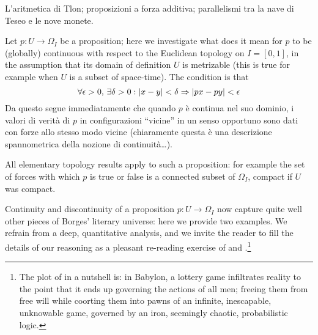 \begin{remark}\label{di_navi_e_numeri}
	L'aritmetica di Tlon; proposizioni a forza additiva; parallelismi tra la nave di Teseo e le nove monete.
\end{remark}
\begin{remark}\label{continuiti}
	Let $p : U \to \Omega_I$ be a proposition; here we investigate what does it mean for $p$ to be (globally) continuous with respect to the Euclidean topology on $I=[0,1]$, in the assumption that its domain of definition $U$ is metrizable (this is true for example when $U$ is a subset of space-time). The condition is that
	\[ \forall \epsilon > 0,\,\exists \delta > 0 : |x-y|< \delta \Rightarrow |px-py| < \epsilon \]
	Da questo segue immediatamente che quando $p$ è continua nel suo dominio, i valori di verità di $p$ in configurazioni ``vicine'' in un senso opportuno sono dati con forze allo stesso modo vicine (chiaramente questa è una descrizione spannometrica della nozione di continuità\dots).

	All elementary topology results apply to such a proposition: for example the set of forces with which $p$ is true or false is a connected subset of $\Omega_I$, compact if $U$ was compact.
\end{remark}
Continuity and discontinuity of a proposition $p : U \to \Omega_I$ now capture quite well other pieces of Borges' literary universe: here we provide two examples. We refrain from a deep, quantitative analysis, and we invite the reader to fill the details of our reasoning as a pleasant re-reading exercise of \cite{babil} and \cite{tlonEN}.\footnote{The plot of \cite{babil} in a nutshell is: in Babylon, a lottery game infiltrates reality to the point that it ends up governing the actions of all men; freeing them from free will while coorting them into pawns of an infinite, inescapable, unknowable game, governed by an iron, seemingly chaotic, probabilistic logic.}
